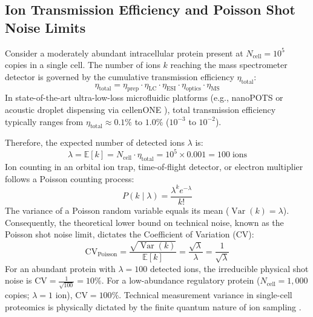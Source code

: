 \documentclass[11pt,twoside,openright]{book}
\begin{document}
\subsection{Ion Transmission Efficiency and Poisson Shot Noise Limits}

Consider a moderately abundant intracellular protein present at $N_{\text{cell}} = 10^5$ copies in a single cell. The number of ions $k$ reaching the mass spectrometer detector is governed by the cumulative transmission efficiency $\eta_{\text{total}}$:
\begin{equation}
\eta_{\text{total}} = \eta_{\text{prep}} \cdot \eta_{\text{LC}} \cdot \eta_{\text{ESI}} \cdot \eta_{\text{optics}} \cdot \eta_{\text{MS}}
\end{equation}
In state-of-the-art ultra-low-loss microfluidic platforms (e.g., nanoPOTS \cite{kelly2020nanopots, cong2021ultrasensitive} or acoustic droplet dispensing via cellenONE \cite{woo2022high}), total transmission efficiency typically ranges from $\eta_{\text{total}} \approx 0.1\%$ to $1.0\%$ ($10^{-3}$ to $10^{-2}$).

Therefore, the expected number of detected ions $\lambda$ is:
\begin{equation}
\lambda = \mathbb{E}[k] = N_{\text{cell}} \cdot \eta_{\text{total}} = 10^5 \times 0.001 = 100 \;\text{ions}
\end{equation}
Ion counting in an orbital ion trap, time-of-flight detector, or electron multiplier follows a Poisson counting process:
\begin{equation}
P(k \mid \lambda) = \frac{\lambda^k e^{-\lambda}}{k!}
\end{equation}
The variance of a Poisson random variable equals its mean ($\operatorname{Var}(k) = \lambda$). Consequently, the theoretical lower bound on technical noise, known as the Poisson shot noise limit, dictates the Coefficient of Variation ($\text{CV}$):
\begin{equation}
\label{eq:poisson_cv}
\text{CV}_{\text{Poisson}} = \frac{\sqrt{\operatorname{Var}(k)}}{\mathbb{E}[k]} = \frac{\sqrt{\lambda}}{\lambda} = \frac{1}{\sqrt{\lambda}}
\end{equation}
For an abundant protein with $\lambda = 100$ detected ions, the irreducible physical shot noise is $\text{CV} = \frac{1}{\sqrt{100}} = 10\%$. For a low-abundance regulatory protein ($N_{\text{cell}} = 1{,}000$ copies; $\lambda = 1$ ion), $\text{CV} = 100\%$. Technical measurement variance in single-cell proteomics is physically dictated by the finite quantum nature of ion sampling \cite{slavov2022single}.
\end{document}
